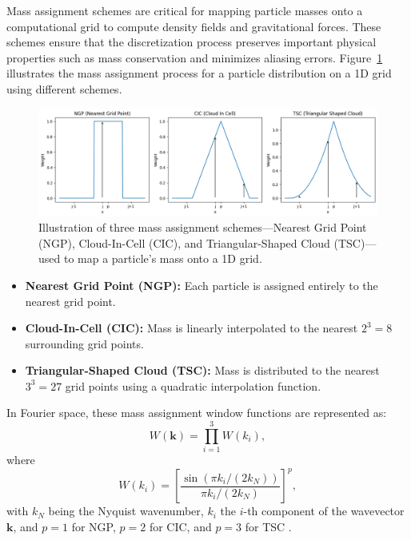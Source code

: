 Mass assignment schemes are critical for mapping particle masses onto a computational grid to compute density fields and gravitational forces. These schemes ensure that the discretization process preserves important physical properties such as mass conservation and minimizes aliasing errors. 
Figure~\ref{fig:mass-assignment} illustrates the mass assignment process for a particle distribution on a 1D grid using different schemes.
\begin{figure}[ht]
    \centering
    \includegraphics[width=\textwidth]{figures/weight_functions.png}
    \caption{Illustration of three mass assignment schemes—Nearest Grid Point (NGP), Cloud-In-Cell (CIC), and Triangular-Shaped Cloud (TSC)—used to map a particle's mass onto a 1D grid.}
    \label{fig:mass-assignment}
\end{figure}
\begin{itemize}
    \item \textbf{Nearest Grid Point (NGP):} Each particle is assigned entirely to the nearest grid point.
    \item \textbf{Cloud-In-Cell (CIC):} Mass is linearly interpolated to the nearest $2^3 = 8$ surrounding grid points.
    \item \textbf{Triangular-Shaped Cloud (TSC):} Mass is distributed to the nearest $3^3 = 27$ grid points using a quadratic interpolation function.
\end{itemize}

In Fourier space, these mass assignment window functions are represented as:
\begin{equation}
    W(\mathbf{k}) = \prod_{i=1}^{3} W(k_i),
\end{equation}
where
\begin{equation}
    W(k_i) = \left[\frac{\sin\left(\pi k_i / (2 k_N)\right)}{\pi k_i / (2 k_N)}\right]^p,
\end{equation}
with $k_N$ being the Nyquist wavenumber, $k_i$ the $i$-th component of the wavevector $\mathbf{k}$, and $p = 1$ for NGP, $p = 2$ for CIC, and $p = 3$ for TSC \citep{1981csup.book.....H, 2008ApJ...687..738C}.

